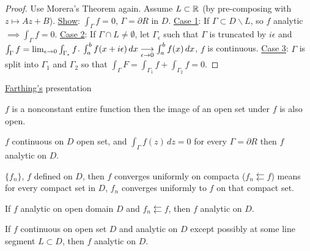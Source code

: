 \documentclass[]{article}
\begin{document}
\begin{proof}
	Use Morera's Theorem again. Assume $L\subset \mathbb{R}$ (by pre-composing with $z\mapsto Az+B$). \underline{Show}: $\int_{\Gamma} f = 0$, $\Gamma = \partial R$ in $D$.
	\underline{Case 1}: If $\Gamma \subset D \backslash L$, so $f$ analytic $\implies \int_{\Gamma} f = 0$.
	\underline{Case 2}: If $\Gamma \cap L \neq \emptyset$, let $\Gamma_\epsilon$ such that $\Gamma$ is truncated by $i\epsilon$ and $\int_{\Gamma} f = \lim_{\epsilon\rightarrow 0} \int_{\Gamma_\epsilon} f$. $\int_a^b f(x+i\epsilon) \, dx \underset{\epsilon\rightarrow 0}{\longrightarrow} \int_a^b f(x) \, dx$, $f$ is continuous.
	\underline{Case 3}: $\Gamma$ is split into $\Gamma_1$ and $\Gamma_2$  so that $\int_{\Gamma} F = \int_{\Gamma_1} f + \int_{\Gamma_2} f = 0$.
\end{proof}

\underline{Farthing's} presentation
\begin{recall}
	 $f$ is a nonconstant entire function then the image of an open set under $f$ is also open.
\end{recall}
\begin{recall}
	 $f$ continuous on $D$ open set, and $\int_{\Gamma} f(z) \, dz = 0$ for every $\Gamma = \partial R$ then $f$ analytic on $D$.
\end{recall}
\begin{recall}
	[Definition] $\{f_n\}$, $f$ defined on $D$, then $f$ converges uniformly on compacta ($f_n\leftleftarrows f$) means for every compact set in $D$, $f_n$ converges uniformly to $f$ on that compact set.
\end{recall}
\begin{recall}
	[Theorem] If $f$ analytic on open domain $D$ and $f_n \leftleftarrows f$, then $f$ analytic on $D$.
\end{recall}
\begin{recall}
	[Theorem] If $f$ continuous on open set $D$ and analytic on $D$ except possibly at some line segment $L\subset D$, then $f$ analytic on $D$.
\end{recall}
\end{document}
